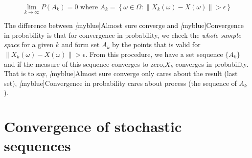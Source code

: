 \begin{enumerate}
\begin{enumerate}
\begin{definition}
\begin{equation*}
                      \lim_{k \to \infty}P(A_{k}) = 0 \text{ where } A_{k}=\left\{\omega \in \Omega:
                      \left\|X_{k}(\omega)-X(\omega)\right\| > \epsilon \right\}
                    \end{equation*}
                  \end{definition}
                  The difference between \emph[myblue]{Almost sure converge} and \emph[myblue]{Convergence in probability} is that for
                  convergence in probability, we check the \emph{whole sample space} for a given $k$ and form set $A_{k}$ by the
                  points that is valid for $\left\|X_{k}(\omega)-X(\omega)\right\| > \epsilon $. From this procedure, we have a set
                  sequence $\{A_{k}\}$ and if the measure of this sequence converges to zero,$X_{k}$ converges in probability. That is
                  to say, \emph[myblue]{Almost sure converge} only cares about the result (last set), \emph[myblue]{Convergence in
                    probability} cares about process (the sequence of $A_{k}$).
          \end{enumerate}
  \end{enumerate}

\section{Convergence of stochastic sequences}

